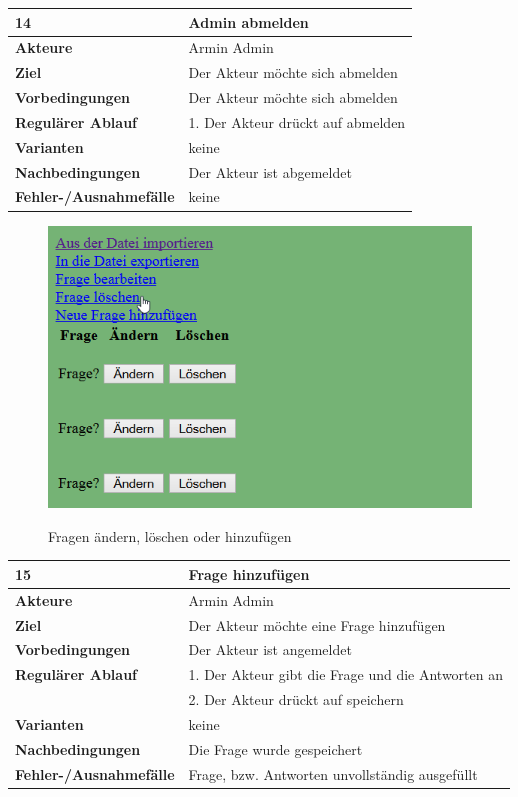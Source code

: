 \documentclass[fontsize=12pt,paper=a4,twoside]{scrartcl}
\begin{document}
\begin{table}
	[H] \label{14} 
	\begin{tabular}
		{|l|p{10cm}|} \hline \textbf{14} & \textbf{Admin abmelden} \\
		\hline \textbf{Akteure} & Armin Admin\\
		\hline \textbf{Ziel} & Der Akteur möchte sich abmelden\\
		\hline \textbf{Vorbedingungen} & Der Akteur möchte sich abmelden\\
		\hline \textbf{Regulärer Ablauf} & 1. Der Akteur drückt auf abmelden\\
		\hline \textbf{Varianten} & keine \\
		\hline \textbf{Nachbedingungen} & Der Akteur ist abgemeldet\\
		\hline \textbf{Fehler-/Ausnahmefälle} & keine \\
		\hline 
	\end{tabular}
\end{table}

\begin{figure}
	[H] \caption{Fragen ändern, löschen oder hinzufügen} 
	\includegraphics[width=0.6
	\textwidth]{Bilder/WebseiteFargen.png} \label{pic:ques} 
\end{figure}

\begin{table}
	[H] \label{15} 
	\begin{tabular}
		{|l|p{10cm}|} \hline \textbf{15} & \textbf{Frage hinzufügen} \\
		\hline \textbf{Akteure} & Armin Admin\\
		\hline \textbf{Ziel} & Der Akteur möchte eine Frage hinzufügen\\
		\hline \textbf{Vorbedingungen} & Der Akteur ist angemeldet\\
		\hline \textbf{Regulärer Ablauf} & 1. Der Akteur gibt die Frage und die Antworten an\\
		&2. Der Akteur drückt auf speichern\\
		\hline \textbf{Varianten} & keine \\
		\hline \textbf{Nachbedingungen} & Die Frage wurde gespeichert\\
		\hline \textbf{Fehler-/Ausnahmefälle} & Frage, bzw. Antworten unvollständig ausgefüllt \\
		\hline 
	\end{tabular}
\end{table}
\end{document}
